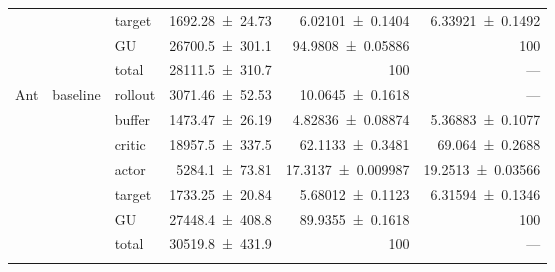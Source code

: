 {\begin{longtable}{@{}lllrrr@{}}
     &  & target & \num{1692.28+-24.73} & \num{6.02101+-0.1404} & \num{6.33921+-0.1492} \\
     &  & GU & \num{26700.5+-301.1} & \num{94.9808+-0.05886} & 100 \\
     &  & total & \num{28111.5+-310.7} & \num{100} & --- \\
    \addlinespace[2pt]
    \midrule
    Ant & baseline & rollout & \num{3071.46+-52.53} & \num{10.0645+-0.1618} & --- \\
     &  & buffer & \num{1473.47+-26.19} & \num{4.82836+-0.08874} & \num{5.36883+-0.1077} \\
     &  & critic & \num{18957.5+-337.5} & \num{62.1133+-0.3481} & \num{69.064+-0.2688} \\
     &  & actor & \num{5284.1+-73.81} & \num{17.3137+-0.009987} & \num{19.2513+-0.03566} \\
     &  & target & \num{1733.25+-20.84} & \num{5.68012+-0.1123} & \num{6.31594+-0.1346} \\
     &  & GU & \num{27448.4+-408.8} & \num{89.9355+-0.1618} & 100 \\
     &  & total & \num{30519.8+-431.9} & \num{100} & --- \\
    \addlinespace[2pt]
  \end{longtable}
}


